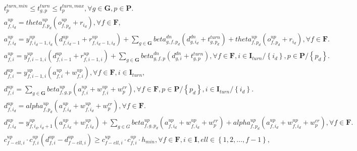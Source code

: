 \begin{align}
  & t_{p}^{turn,min} \leq t_{g , p}^{turn} \leq t_{p}^{turn,max} , \forall g \in \mathbf{G} , p \in \mathbf{P} . \tag{eq\_0018} \\
  & a_{f , i_{d}}^{up} = \mathit{theta}_{f , p_{d}}^{up} \left(o_{f , p_{d}}^{up} + r_{i_{d}}\right) , \forall f \in \mathbf{F} , \tag{eq\_0019} \\
  & a_{f , i_{d}}^{up} = y_{f , i_{d} - 1 , i_{d}}^{up} \left(d_{f , i_{d} - 1}^{up} + r_{f , i_{d} - 1 , i_{d}}^{up}\right) + \sum_{g \in \mathbf{G}} \mathit{beta}_{g , f , p_{d}}^{dn} \left(d_{g , i_{d}}^{dn} + t_{g , p_{d}}^{turn}\right) + \mathit{theta}_{f , p_{d}}^{up} \left(o_{f , p_{d}}^{up} + r_{i_{d}}\right) , \forall f \in \mathbf{F} . \tag{eq\_0020} \\
  & a_{f , i}^{up} = y_{f , i - 1 , i}^{up} \left(d_{f , i - 1}^{up} + r_{f , i - 1 , i}^{up}\right) + \sum_{g \in \mathbf{G}} \mathit{beta}_{g , f , p}^{dn} \left(d_{g , i}^{dn} + t_{g , p}^{turn}\right) , \forall f \in \mathbf{F} , i \in \mathbf{I}_{turn} / \left\{i_{d}\right\} , p \in \mathbf{P} / \left\{p_{d}\right\} . \tag{eq\_0021} \\
  & d_{f , i}^{up} = y_{f , i - 1 , i}^{up} \left(a_{f , i}^{up} + w_{f , i}^{up}\right) , \forall f \in \mathbf{F} , i \in \mathbf{I}_{turn} , \tag{eq\_0022} \\
  & d_{f , i}^{up} = \sum_{g \in \mathbf{G}} \mathit{beta}_{f , g , p}^{up} \left(a_{f , i}^{up} + w_{f , i}^{up} + w_{p}^{cr}\right) , \forall f \in \mathbf{F} , p \in \mathbf{P} / \left\{p_{d}\right\} , i \in \mathbf{I}_{turn} / \left\{i_{d}\right\} . \tag{eq\_0023} \\
  & d_{f , i_{d}}^{up} = \mathit{alpha}_{f , p_{d}}^{up} \left(a_{f , i_{d}}^{up} + w_{f , i_{d}}^{up} + w_{p}^{cr}\right) , \forall f \in \mathbf{F} . \tag{eq\_0024} \\
  & d_{f , i_{d}}^{up} = y_{f , i_{d} , i_{d} + 1}^{up} \left(a_{f , i_{d}}^{up} + w_{f , i_{d}}^{up}\right) + \sum_{g \in G} \mathit{beta}_{f , g , p_{d}}^{up} \left(a_{f , i_{d}}^{up} + w_{f , i_{d}}^{up} + w_{p}^{cr}\right) + \mathit{alpha}_{f , p_{d}}^{up} \left(a_{f , i_{d}}^{up} + w_{f , i_{d}}^{up} + w_{p}^{cr}\right) , \forall f \in \mathbf{F} . \tag{eq\_0026} \\
  & c_{f - \mathit{ell} , i}^{up} \cdot c_{f , i}^{up} \left(d_{f , i}^{up} - d_{f - \mathit{ell} , i}^{up}\right) \geq c_{f - \mathit{ell} , i}^{up} \cdot c_{f , i}^{up} \cdot h_{min} , \forall f \in \mathbf{F} , i \in \mathbf{I} , \mathit{ell} \in \left\{1 , 2 , \ldots , f - 1\right\} , \tag{eq\_0028} \\

\end{align}
